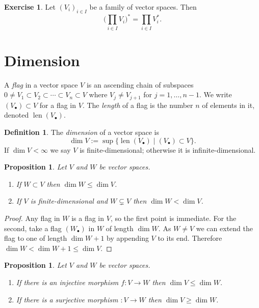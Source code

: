 \documentclass[11pt]{article}
\newtheorem{prop}[theo]{Proposition}
\theoremstyle{definition}
\newtheorem{defi}[theo]{Definition}
\newtheorem{exer}[theo]{Exercise}
\DeclareMathOperator{\len}{len}
\begin{document}
\begin{exer}
Let $(V_i)_{i \in I}$ be a family of vector spaces.
Then
\[
\biggl( \prod_{i \in I} V_i \biggr)^* \!\! =
\prod_{i \in I} V_i^*.
\]
\end{exer}




\section{Dimension}



A \emph{flag} in a vector space $V$ is an ascending chain of subspaces $0 \not= V_1 \subset V_2 \subset \cdots \subset V_n \subset V$ where $V_j \not= V_{j+1}$ for $j = 1,\ldots,n-1$.
We write $(V_\bullet) \subset V$ for a flag in $V$.
The \emph{length} of a flag is the number $n$ of elements in it, denoted $\len(V_\bullet)$.

\begin{defi}
The \emph{dimension} of a vector space is
\[
\dim V := \sup \{ \len (V_\bullet) \mid (V_\bullet) \subset V \}.
\]
If $\dim V < \infty$ we say $V$ is finite-dimensional; otherwise it is infinite-dimens\-ional.
\end{defi}


\begin{prop}
Let $V$ and $W$ be vector spaces.
\begin{enumerate}
\item
If $W \subset V$ then $\dim W \leq \dim V$.

\item
If $V$ is finite-dimensional and $W \subsetneq V$ then $\dim W < \dim V$.
\end{enumerate}
\end{prop}

\begin{proof}
Any flag in $W$ is a flag in $V$, so the first point is immediate.
For the second, take a flag $(W_\bullet)$ in $W$ of length $\dim W$.
As $W \not= V$ we can extend the flag to one of length $\dim W+1$ by appending $V$ to its end.
Therefore $\dim W < \dim W + 1 \leq \dim V$.
\end{proof}


\begin{prop}
Let $V$ and $W$ be vector spaces.
\begin{enumerate}
\item
If there is an injective morphism $f : V \to W$ then $\dim V \leq \dim W$.

\item
If there is a surjective morphism $ : V \to W$ then $\dim V \geq \dim W$.
\end{enumerate}
\end{prop}
\end{document}
